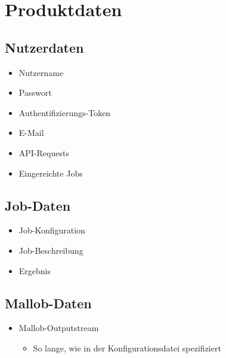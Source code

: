 \section{Produktdaten}


\subsection{Nutzerdaten}
\begin{itemize}
    \item Nutzername
    \item Passwort
    \item Authentifizierungs-Token
    \item E-Mail
    \item API-Requests
    \item Eingereichte Jobs
\end{itemize}

\subsection{Job-Daten}
\begin{itemize}
    \item Job-Konfiguration
    \item Job-Beschreibung
    \item Ergebnis
\end{itemize}

\subsection{Mallob-Daten}
\begin{itemize}
    \item Mallob-Outputstream 
    \begin{itemize}
        \item So lange, wie in der Konfigurationsdatei spezifiziert
    \end{itemize}
    
\end{itemize}
